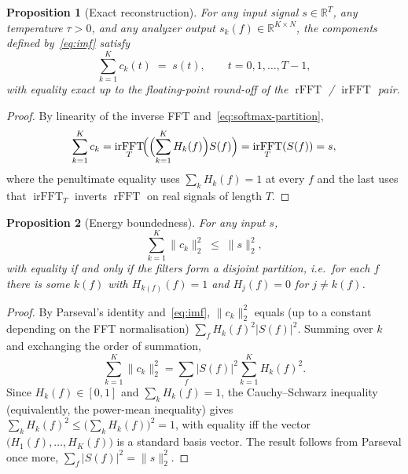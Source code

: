 \documentclass[journal]{IEEEtran}
\newtheorem{proposition}{Proposition}
\theoremstyle{remark}
\newcommand{\R}{\mathbb{R}}
\DeclareMathOperator{\rFFT}{rFFT}
\DeclareMathOperator{\irFFT}{irFFT}
\begin{document}
\begin{proposition}[Exact reconstruction]
\label{prop:recon}
For any input signal $s \in \R^{T}$, any temperature $\tau > 0$, and
any analyzer output $s_{k}(f) \in \R^{K\times N}$, the components
defined by~\eqref{eq:imf} satisfy
\begin{equation}
\sum_{k=1}^{K} c_{k}(t) \;=\; s(t), \qquad t = 0, 1, \ldots, T-1 ,
\end{equation}
with equality exact up to the floating-point round-off of the
$\rFFT$ / $\irFFT$ pair.
\end{proposition}

\begin{proof}
By linearity of the inverse FFT and~\eqref{eq:softmax-partition},
\[
\sum_{k=1}^{K} c_{k}
= \irFFT_{T}\!\Bigl(\Bigl(\sum_{k=1}^{K} H_{k}(f)\Bigr) S(f)\Bigr)
= \irFFT_{T}(S(f)) = s ,
\]
where the penultimate equality uses $\sum_{k} H_{k}(f) = 1$ at every
$f$ and the last uses that $\irFFT_{T}$ inverts $\rFFT$ on real
signals of length $T$.
\end{proof}

\begin{proposition}[Energy boundedness]
\label{prop:energy}
For any input $s$,
\begin{equation}
\sum_{k=1}^{K} \|c_{k}\|_{2}^{2} \;\leq\; \|s\|_{2}^{2} ,
\label{eq:energy-bound}
\end{equation}
with equality if and only if the filters form a disjoint partition,
i.e.\ for each $f$ there is some $k(f)$ with $H_{k(f)}(f)=1$ and
$H_{j}(f)=0$ for $j\neq k(f)$.
\end{proposition}

\begin{proof}
By Parseval's identity and~\eqref{eq:imf},
$\|c_{k}\|_{2}^{2}$ equals (up to a constant depending on the FFT
normalisation) $\sum_{f} H_{k}(f)^{2} \lvert S(f)\rvert^{2}$.
Summing over $k$ and exchanging the order of summation,
\begin{equation}
\sum_{k=1}^{K} \|c_{k}\|_{2}^{2}
= \sum_{f} \lvert S(f)\rvert^{2} \sum_{k=1}^{K} H_{k}(f)^{2} .
\label{eq:parseval-sum}
\end{equation}
Since $H_{k}(f) \in [0,1]$ and $\sum_{k} H_{k}(f) = 1$, the Cauchy--Schwarz
inequality (equivalently, the power-mean inequality) gives
$\sum_{k} H_{k}(f)^{2} \leq \bigl(\sum_{k} H_{k}(f)\bigr)^{2} = 1$,
with equality iff the vector $\bigl(H_{1}(f), \ldots, H_{K}(f)\bigr)$
is a standard basis vector. The result follows from Parseval once more,
$\sum_{f} \lvert S(f)\rvert^{2} = \|s\|_{2}^{2}$.
\end{proof}
\end{document}
